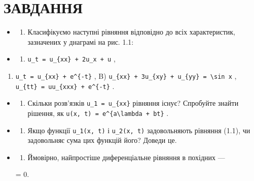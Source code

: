 \documentclass[
  ukrainian,
]{article}
\providecommand{\tightlist}{%
  \setlength{\itemsep}{0pt}\setlength{\parskip}{0pt}}
\begin{document}
\section{ЗАВДАННЯ}\label{ux437ux430ux432ux434ux430ux43dux43dux44f}

\begin{itemize}
\tightlist
\item
  \begin{enumerate}
  \def\labelenumi{\arabic{enumi}.}
  \tightlist
  \item
    Класифікуємо наступні рівняння відповідно до всіх характеристик,
    зазначених у днаграмі на рис. 1.1:
  \end{enumerate}
\item
  \begin{enumerate}
  \def\labelenumi{\alph{enumi})}
  \tightlist
  \item
    \texttt{u\_t\ =\ u\_\{xx\}\ +\ 2u\_x\ +\ u} ,
  \end{enumerate}
\end{itemize}

\begin{enumerate}
\def\labelenumi{\arabic{enumi})}
\setcounter{enumi}{5}
\tightlist
\item
  \texttt{u\_t\ =\ u\_\{xx\}\ +\ e\^{}\{-t\}} , B)
  \texttt{u\_\{xx\}\ +\ 3u\_\{xy\}\ +\ u\_\{yy\}\ =\ \textbackslash{}sin\ x}
  , \texttt{u\_\{tt\}\ =\ uu\_\{xxx\}\ +\ e\^{}\{-t\}} .
\end{enumerate}

\begin{itemize}
\item
  \begin{enumerate}
  \def\labelenumi{\arabic{enumi}.}
  \setcounter{enumi}{1}
  \tightlist
  \item
    Скільки розв'язків \texttt{u\_1\ =\ u\_\{xx\}} рівняння існує?
    Спробуйте знайти рішення, як
    \texttt{u(x,\ t)\ =\ e\^{}\{a\textbackslash{}lambda\ +\ bt\}} .
  \end{enumerate}
\item
  \begin{enumerate}
  \def\labelenumi{\arabic{enumi}.}
  \setcounter{enumi}{2}
  \tightlist
  \item
    Якщо функції \texttt{u\_1(x,\ t)} і \texttt{u\_2(x,\ t)}
    задовольняють рівняння (1.1), чи задовольняє сума цих функцій його?
    Доведи це.
  \end{enumerate}
\item
  \begin{enumerate}
  \def\labelenumi{\arabic{enumi}.}
  \setcounter{enumi}{3}
  \tightlist
  \item
    Ймовірно, найпростіше диференціальне рівняння в похідних ---
  \end{enumerate}

   = 0.
\end{itemize}
\end{document}
